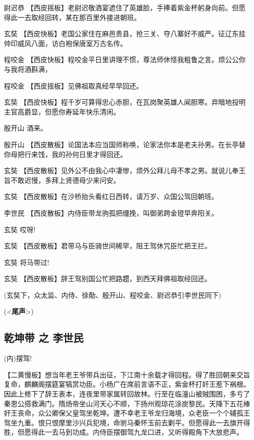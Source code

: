 尉迟恭
【西皮摇板】老尉迟敬酒宴遮住了英雄脸，手捧着紫金杯躬身向前。但愿得此一去取经回转，某在那百里外接进朝班。

玄奘
【西皮快板】老国公家住在麻邑贵县，抢三关、夺八寨好不威严。征辽东挂帅印威风八面，访白袍保唐室万古名传。

程咬金
【西皮快板】程咬金平日里讲理不惯，尊法师休怪我粗鲁之言。烦公公你与我将酒斟满，

程咬金 【西皮摇板】见佛祖取真经早早回还。

玄奘
【西皮快板】程千岁可算得忠心赤胆，在瓦岗聚英雄人闻胆寒。弃暗地投明主官高爵显，但愿你寿延年快乐清闲。

殷开山 酒来。

殷开山
【西皮散板】论国法本应当国师称唤，论家法你本是老夫孙男。在长亭替你母把行来饯，我的孙何日里才得回还。

玄奘
【西皮散板】见外公不由我心中凄惨，烦外公拜儿母不孝之男。就说儿奉王旨不敢迟慢，多拜上贤德母少来问安。

玄奘 【西皮散板】在沙桥抬头看红日西转，请万岁、众国公驾回朝班。

李世民 【西皮散板】内侍臣带龙驹孤把缰挽，叫御弟跨金镫早奔阳关。

玄奘 哎呀!

玄奘 【西皮散板】君带马与臣骑世间稀罕，阻王驾休咒臣忙把王拦。

玄奘 将马带过!

玄奘 【西皮散板】辞王驾别国公忙把路趱，到西天拜佛祖取经回还。

(玄奘下，众太监、内侍、徐勣、殷开山、程咬金、尉迟恭引李世民同下)

(\textless{}\textbf{尾声}\textgreater{})

\hypertarget{ux4e7eux5764ux5e26-ux4e4b-ux674eux4e16ux6c11}{%
\subsection{乾坤带 之
李世民}\label{ux4e7eux5764ux5e26-ux4e4b-ux674eux4e16ux6c11}}

(内)摆驾!

【二黄慢板】想当年老王爷带兵出征，下江南十余载才得回程。得了胜回朝来交旨复命，麒麟阁摆筵宴犒赏功臣。小杨广在席前言语不正，紫金杯打奸王惹下祸根。因此上修下了辞王表本，连夜里带家属转回故林。行至在临潼山被贼围困，多亏了秦恩公搭救满门。隋炀帝坐山河天心不顺，下扬州观琼花涂炭黎民。天降下五花棒奸王丧命，众公卿保父皇驾坐乾坤。遭不幸老王爷龙归海境，众老臣一个个辅孤王驾坐九重。恨只恨摩里沙兴兵犯境，命驸马秦怀玉前去剿平。但愿得此一去旗开得胜，但愿得此一去马到功成。内侍臣摆御驾九龙口进，又听得殿角下大放悲声。

